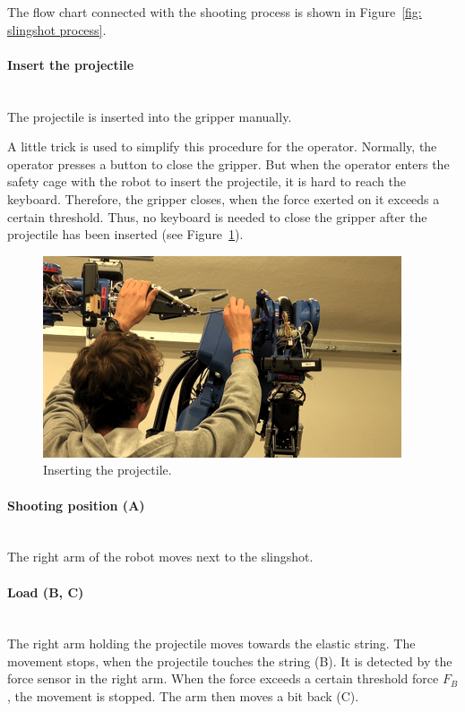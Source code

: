 			The flow chart connected with the shooting process is shown in Figure~\ref{fig: slingshot process}.
				
			\paragraph{Insert the projectile}~\\
				\indent The projectile is inserted into the gripper manually.
				
				A little trick is used to simplify this procedure for the operator. Normally, the operator presses a button to close the gripper. But when the operator enters the safety cage with the robot to insert the projectile, it is hard to reach the keyboard. Therefore, the gripper closes, when the force exerted on it exceeds a certain threshold. Thus, no keyboard is needed to close the gripper after the projectile has been inserted (see Figure~\ref{fig:ProjectileInsertion}).

				\begin{figure}
				\includegraphics[width=0.5\textheight]{ProjectileInsertionAdj.png}			
				\centering
				\caption{Inserting the projectile.}
				\label{fig:ProjectileInsertion}
				\end{figure}

				
			\paragraph{Shooting position (A)}~\\
				\indent The right arm of the robot moves next to the slingshot.
				
			\paragraph{Load (B, C)}~\\
				\indent The right arm holding the projectile moves towards the elastic string. The movement stops, when the projectile touches the string (B). It is detected by the force sensor in the right arm. When the force exceeds a certain threshold force $F_B$, the movement is stopped. The arm then moves a bit back (C).
				
